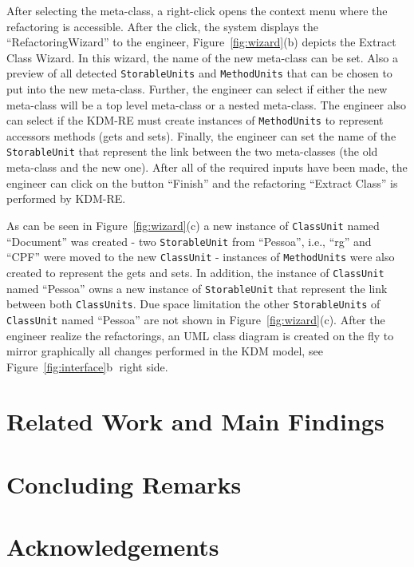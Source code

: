 \documentclass[12pt]{article}
\begin{document}
After selecting the meta-class, a right-click opens the context menu where the refactoring is accessible. After the click, the system displays the ``RefactoringWizard'' to the engineer, Figure~\ref{fig:wizard}(b) depicts the Extract Class Wizard. In this wizard, the name of the new meta-class can be set. Also a preview of all detected \texttt{StorableUnits} and \texttt{MethodUnits} that can be chosen to put into the new meta-class. Further, the engineer can select if either the new meta-class will be a top level meta-class or a nested meta-class. The engineer also can select if the KDM-RE must create instances of \texttt{MethodUnits} to represent accessors methods (gets and sets). Finally, the engineer can set the name of the \texttt{StorableUnit} that represent the link between the two meta-classes (the old meta-class and the new one). After all of the required inputs have been made, the engineer can click on the button ``Finish'' and the refactoring ``Extract Class'' is performed by KDM-RE. 

As can be seen in Figure~\ref{fig:wizard}(c) a new instance of \texttt{ClassUnit} named ``Document'' was created - two \texttt{StorableUnit} from ``Pessoa'', i.e., ``rg'' and ``CPF'' were moved to the new \texttt{ClassUnit} - instances of \texttt{MethodUnits} were also created to represent the gets and sets. In addition, the instance of \texttt{ClassUnit} named ``Pessoa'' owns a new instance of \texttt{StorableUnit} that represent the link between both \texttt{ClassUnits}. Due space limitation the other \texttt{StorableUnits} of \texttt{ClassUnit} named ``Pessoa'' are not shown in Figure~\ref{fig:wizard}(c). After the engineer realize the refactorings, an UML class diagram is created on the fly to mirror graphically all changes performed in the KDM model, see Figure~\ref{fig:interface}\textcircled{b} right side. %


\section{Related Work and Main Findings\label{sec:related}}
 

\section{Concluding Remarks\label{sec:conclusion}}
 

\section{Acknowledgements}~\label{sec:ack}
 



\end{document}

